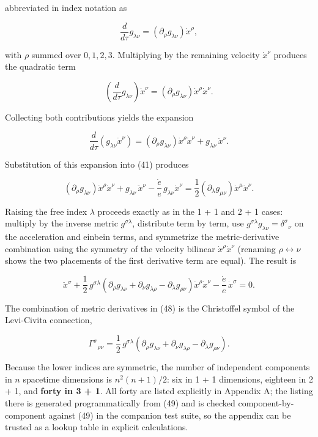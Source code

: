 \documentclass[
]{article}
\begin{document}
abbreviated in index notation as

\[\frac{d}{d\tau} g_{\lambda\nu} = \left( \partial_{\rho} g_{\lambda\nu} \right) \dot{x}^{\rho}, \tag{44}\]

with \(\rho\) summed over \(0, 1, 2, 3\). Multiplying by the remaining
velocity \(\dot{x}^{\nu}\) produces the quadratic term

\[\left( \frac{d}{d\tau} g_{\lambda\nu} \right) \dot{x}^{\nu} = \left( \partial_{\rho} g_{\lambda\nu} \right) \dot{x}^{\rho} \dot{x}^{\nu}. \tag{45}\]

Collecting both contributions yields the expansion

\[\frac{d}{d\tau} \left( g_{\lambda\nu} \dot{x}^{\nu} \right) = \left( \partial_{\rho} g_{\lambda\nu} \right) \dot{x}^{\rho} \dot{x}^{\nu} + g_{\lambda\nu}\, \ddot{x}^{\nu}. \tag{46}\]

Substitution of this expansion into (41) produces

\[\left( \partial_{\rho} g_{\lambda\nu} \right) \dot{x}^{\rho} \dot{x}^{\nu} + g_{\lambda\nu}\, \ddot{x}^{\nu} - \frac{\dot{e}}{e}\, g_{\lambda\nu} \dot{x}^{\nu} = \frac{1}{2} \left( \partial_{\lambda} g_{\mu\nu} \right) \dot{x}^{\mu} \dot{x}^{\nu}. \tag{47}\]

Raising the free index \(\lambda\) proceeds exactly as in the 1 + 1 and
2 + 1 cases: multiply by the inverse metric \(g^{\sigma\lambda}\),
distribute term by term, use
\(g^{\sigma\lambda} g_{\lambda\nu} = \delta^{\sigma}{}_{\nu}\) on the
acceleration and einbein terms, and symmetrize the metric-derivative
combination using the symmetry of the velocity bilinear
\(\dot{x}^{\rho} \dot{x}^{\nu}\) (renaming \(\rho \leftrightarrow \nu\)
shows the two placements of the first derivative term are equal). The
result is

\[\ddot{x}^{\sigma} + \frac{1}{2}\, g^{\sigma\lambda} \left( \partial_{\rho} g_{\lambda\nu} + \partial_{\nu} g_{\lambda\rho} - \partial_{\lambda} g_{\rho\nu} \right) \dot{x}^{\rho} \dot{x}^{\nu} - \frac{\dot{e}}{e}\, \dot{x}^{\sigma} = 0. \tag{48}\]

The combination of metric derivatives in (48) is the Christoffel symbol
of the Levi-Civita connection,

\[\Gamma^{\sigma}{}_{\rho\nu} = \frac{1}{2}\, g^{\sigma\lambda} \left( \partial_{\rho} g_{\lambda\nu} + \partial_{\nu} g_{\lambda\rho} - \partial_{\lambda} g_{\rho\nu} \right). \tag{49}\]

Because the lower indices are symmetric, the number of independent
components in \(n\) spacetime dimensions is \(n^{2}(n+1)/2\): six in 1 +
1 dimensions, eighteen in 2 + 1, and \textbf{forty in 3 + 1}. All forty
are listed explicitly in Appendix A; the listing there is generated
programmatically from (49) and is checked component-by-component against
(49) in the companion test suite, so the appendix can be trusted as a
lookup table in explicit calculations.
\end{document}
